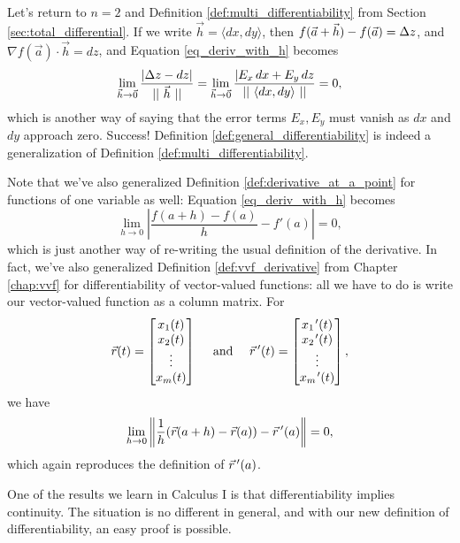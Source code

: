 Let's return to $n=2$ and Definition \ref{def:multi_differentiability} from Section \ref{sec:total_differential}. If we write $\vec{h} = \langle dx, dy\rangle$, then $f(\vec{a}+\vec{h})-f(\vec{a}) = \Delta z$, and $\nabla f(\vec{a})\cdot \vec{h} = dz$, and Equation \eqref{eq_deriv_with_h} becomes
\[
\lim_{\vec{h}\to\vec{0}}\frac{\lvert \Delta z-dz\rvert}{||\ \vec{h}\ ||} = \lim_{\vec{h}\to\vec{0}}\frac{\lvert E_x\,dx+E_y\,dz}{||\ \langle dx,dy\rangle\ ||} = 0,
\]
which is another way of saying that the error terms $E_x,E_y$ must vanish as $dx$ and $dy$ approach zero. Success! Definition \ref{def:general_differentiability} is indeed a generalization of Definition \ref{def:multi_differentiability}.

Note that we've also generalized Definition \ref{def:derivative_at_a_point} for functions of one variable as well: Equation \eqref{eq_deriv_with_h} becomes
\[
\lim_{h\to 0}\left\lvert \frac{f(a+h)-f(a)}{h}-f'(a)\right\rvert = 0,
\]
which is just another way of re-writing the usual definition of the derivative. In fact, we've also generalized Definition \ref{def:vvf_derivative} from Chapter \ref{chap:vvf} for differentiability of vector-valued functions: all we have to do is write our vector-valued function as a column matrix. For
\[
\vec{r}(t) = \begin{bmatrix}x_1(t)\\x_2(t)\\\vdots \\x_m(t)\end{bmatrix} \quad \text{ and } \quad \vec r\, '(t) = \begin{bmatrix}x_1\hskip.75pt'(t)\\x_2\hskip.75pt'(t)\\\vdots \\x_m\hskip.75pt'(t)\end{bmatrix},
\]
we have
\[
\lim_{h\to 0}\left\lVert \frac{1}{h}(\vec{r}(a+h)-\vec{r}(a))- \vec r\, '(a)\right\rVert = 0,
\]
which again reproduces the definition of $\vec r\, '(a)$.

One of the results we learn in Calculus I is that differentiability implies continuity. The situation is no different in general, and with our new definition of differentiability, an easy proof is possible.

\\

